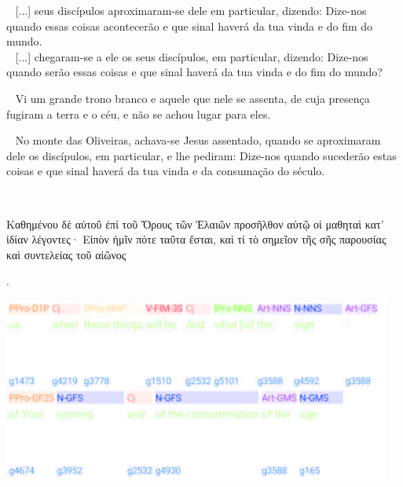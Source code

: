 \documentclass[12pt,aspectratio=169]{beamer}
\newcommand{\ver}[1]{%
    \raisebox{0.50ex}{%
        \scalebox{1.1}{%
            \pmb{\textbf{\textcolor{BSpbg}{#1}}}%
        }%
    }%
}
\newcommand{\QUOTE}[1]{%
    \par\noindent\hspace*{0.1\linewidth}%
    \begin{minipage}{0.8\linewidth}%
        \linespread{1.35}\large{#1}%
    \end{minipage}%
}
\newcommand{\YEL}[1]{{\textcolor{TXyel}{#1}}}
\newcommand{\GRE}[1]{{\textcolor{TXgre}{#1}}}
\newcommand{\CYA}[1]{{\textcolor{TXcya}{#1}}}
\newcommand{\MAG}[1]{{\textcolor{TXmag}{#1}}}
\newcommand{\BRI}[1]{{\textcolor{BSpbg}{#1}}}   %
\newcommand{\GRtxt}[1]{\begin{otherlanguage}{greek}{{#1}}\end{otherlanguage}}
\begin{document}
    \begin{frame}
        \QUOTE{%
            \ver{(A21) Mt~24.3}~%
            [...] seus discípulos  aproximaram-se  dele  em  particular,  dizendo:  Dize-nos
            \YEL{quando essas coisas acontecerão} e \GRE{que sinal haverá da tua vinda} e do
            \MAG{fim do mundo}. \\[\bigskipamount]
            \ver{(ARC) Mt~24.3}~%
            [...] chegaram-se a ele os seus discípulos,  em  particular,  dizendo:  Dize-nos
            \YEL{quando serão essas coisas} e \GRE{que sinal  haverá  da  tua  vinda}  e  do
            \MAG{fim do mundo}?
        }
    \end{frame}

    \begin{frame}
        \QUOTE{%
            \ver{(ARA) Ap~20.11}~%
            Vi um \BRI{grande trono branco} e \BRI{aquele que  nele  se  assenta},  de  cuja
            presença \YEL{fugiram} a \GRE{terra} e o \CYA{céu}, e \MAG{não  se  achou  lugar
            para eles}.
        }
    \end{frame}

    \begin{frame}
        \QUOTE{%
            \ver{(ARA) Mt~24.3}~%
            No monte das Oliveiras, achava-se Jesus assentado, quando se aproximaram dele os
            discípulos, \BRI{em particular}, e lhe pediram: Dize-nos  \YEL{quando  sucederão
            estas coisas} e \GRE{que sinal haverá da tua  vinda}  e  da  \MAG{consumação  do
            século}.
        }
    \end{frame}

    \begin{frame}
        \QUOTE{%
            \ver{(SBL) Mt~24.3}~%
            \GRtxt{Καθημένου δὲ αὐτοῦ ἐπὶ τοῦ Ὄρους τῶν Ἐλαιῶν  προσῆλθον  αὐτῷ  οἱ  μαθηταὶ
            κατ’ ἰδίαν λέγοντες· Εἰπὸν ἡμῖν \YEL{πότε ταῦτα ἔσται}, καὶ \GRE{τί  τὸ  σημεῖον
            τῆς σῆς παρουσίας} καὶ \MAG{συντελείας τοῦ αἰῶνος}}.
        }
    \end{frame}

    \begin{frame}
        \begin{center}
            \includegraphics[width=128mm]{fig/Mt24-Greek-Crop-Alpha.png}
        \end{center}
    \end{frame}
\end{document}

